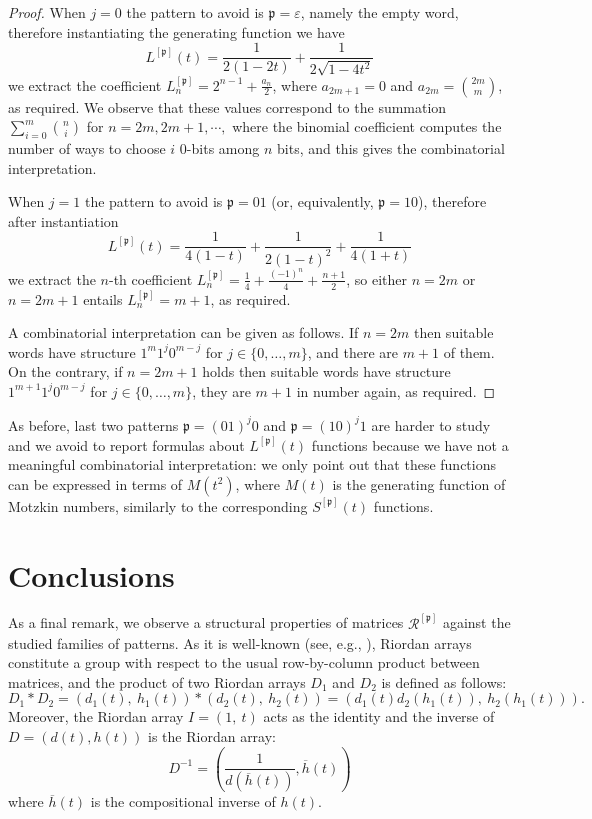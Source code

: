 \begin{proof}
When $j=0$ the pattern to avoid is $\mathfrak{p}=\varepsilon $, namely the
empty word, therefore instantiating the generating function we have
\begin{displaymath}
L^{[\mathfrak{p}]}(t) =\frac{1}{2(1-2t)} +\frac{1}{2\sqrt{1-4t^{2}}}
\end{displaymath}
we extract the coefficient $L_{n}^{[\mathfrak{p}]} = 2^{n-1} + \frac{a_{n}}{2}$,
where $a_{2m+1}=0$ and $a_{2m}={{2m}\choose{m}}$, as required. We observe that these values
correspond to the summation $\sum_{i=0}^m {n \choose i}$ for $n=2m,2m+1,\cdots,$
where the binomial coefficient computes the number of ways to choose $i$  $0$-bits among $n$ bits,
and this gives the combinatorial interpretation.

When $j=1$ the pattern to avoid is $\mathfrak{p}=01$ (or, equivalently,
$\mathfrak{p}=10$), therefore after instantiation
\begin{displaymath}
L^{[\mathfrak{p}]}(t) =\frac{1}{4(1-t)} + \frac{1}{2(1-t)^{2}} +\frac{1}{4(1+t)}
\end{displaymath}
we extract the $n$-th coefficient $L_{n}^{[\mathfrak{p}]} = \frac{1}{4} + \frac{(-1)^{n}}{4} +\frac{n+1}{2} $,
so either $n=2m$ or $n=2m+1$ entails $L_{n}^{[\mathfrak{p}]} = m+1$, as required.

A combinatorial interpretation can be given as follows. If $n=2m$ then suitable
words have structure $1^{m}1^{j}0^{m-j}$ for $j\in \lbrace 0, \ldots,m \rbrace$,
and there are $m+1$ of them. On the contrary, if $n=2m+1$ holds then suitable
words have structure $1^{m+1}1^{j}0^{m-j}$ for $j\in \lbrace 0, \ldots,m
\rbrace$, they are $m+1$ in number again, as required.
\end{proof}

As before, last two patterns $\mathfrak{p}=(01)^{j}0$ and
$\mathfrak{p}=(10)^{j}1$ are harder to study and we avoid to report formulas
about $L^{[\mathfrak{p}]}(t)$ functions because we have not a meaningful
combinatorial interpretation: we only point out that these functions can be
expressed in terms of $M(t^{2})$, where $M(t)$ is the generating function of
Motzkin numbers, similarly to the corresponding $S^{[\mathfrak{p}]}(t)$ functions.

\section{Conclusions}

As a final remark, we observe a structural properties of matrices
$\mathcal{R}^{[\mathfrak{p}]}$ against the studied families of patterns.
As it is well-known (see, e.g., \citep{LUZON201475,MRSV97,SHAPIRO1991229}),
Riordan arrays constitute a group with respect to the usual row-by-column product between matrices,
and the product of two Riordan arrays $D_1$ and $D_2$ is defined as follows:
$$
  D_1 \ast D_2 = (d_1(t),\ h_1(t)) \ast (d_2(t),\ h_2(t)) =(d_1(t)d_2(h_1(t)),\ h_2(h_1(t))).
$$
Moreover, the Riordan array $I = (1,\ t)$ acts as the identity and the inverse of $D =(d(t), h(t))$ is the Riordan array:
$$
D^{-1} = \left( \frac{1}{d(\overline{h}(t))},
  \overline{h}(t) \right)
$$
where $\overline{h}(t)$ is the compositional inverse of $h(t)$.

